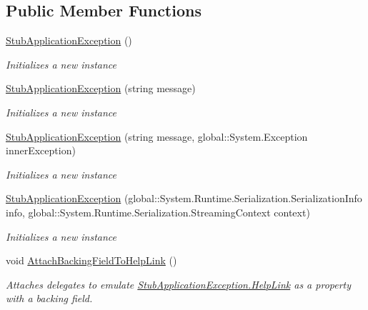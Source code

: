 \subsection*{Public Member Functions}
\begin{DoxyCompactItemize}
\item 
\hyperlink{class_system_1_1_fakes_1_1_stub_application_exception_af4c29610db35f422404a8e1c13a14dfd}{Stub\-Application\-Exception} ()
\begin{DoxyCompactList}\small\item\em Initializes a new instance\end{DoxyCompactList}\item 
\hyperlink{class_system_1_1_fakes_1_1_stub_application_exception_a4f86deb90b7426dcc9bd6e2a1826a1bc}{Stub\-Application\-Exception} (string message)
\begin{DoxyCompactList}\small\item\em Initializes a new instance\end{DoxyCompactList}\item 
\hyperlink{class_system_1_1_fakes_1_1_stub_application_exception_a3db67307f65092dd01309fdcee8239d9}{Stub\-Application\-Exception} (string message, global\-::\-System.\-Exception inner\-Exception)
\begin{DoxyCompactList}\small\item\em Initializes a new instance\end{DoxyCompactList}\item 
\hyperlink{class_system_1_1_fakes_1_1_stub_application_exception_a277b236a7752e469b90cc04d3553b4f7}{Stub\-Application\-Exception} (global\-::\-System.\-Runtime.\-Serialization.\-Serialization\-Info info, global\-::\-System.\-Runtime.\-Serialization.\-Streaming\-Context context)
\begin{DoxyCompactList}\small\item\em Initializes a new instance\end{DoxyCompactList}\item 
void \hyperlink{class_system_1_1_fakes_1_1_stub_application_exception_a03d39c0292b1af966d78d34446156759}{Attach\-Backing\-Field\-To\-Help\-Link} ()
\begin{DoxyCompactList}\small\item\em Attaches delegates to emulate \hyperlink{class_system_1_1_fakes_1_1_stub_application_exception_ac35a9dd52d15eb63cb33d25e8f40164a}{Stub\-Application\-Exception.\-Help\-Link} as a property with a backing field.\end{DoxyCompactList}\item 

\end{DoxyCompactItemize}
